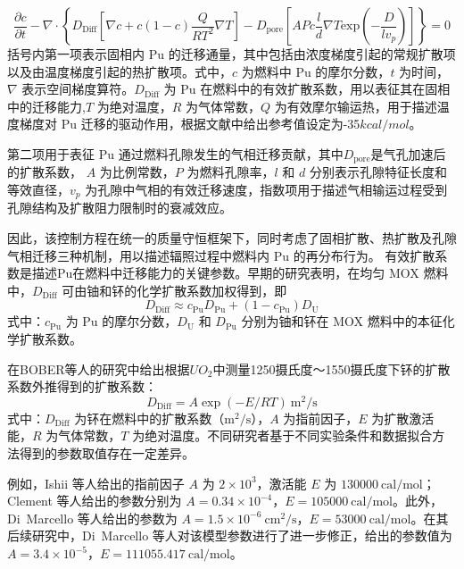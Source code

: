 \begin{equation}
	\frac{\partial c}{\partial t} - \nabla \cdot \left\{D_{\mathrm{Diff}}\left[ \nabla c + c(1-c)\frac{Q}{RT^{2}}\nabla T\right]    - D_{\mathrm{pore}}\left[ APc\frac{l}{d} \nabla T \text{exp}\left(-\frac{D}{lv_p}\right)\right] \right\} = 0
\end{equation}
括号内第一项表示固相内 Pu 的迁移通量，其中包括由浓度梯度引起的常规扩散项以及由温度梯度引起的热扩散项。式中，$c$ 为燃料中 Pu 的摩尔分数，$t$ 为时间，$\nabla$ 表示空间梯度算符。$D_{\mathrm{Diff}}$ 为 Pu 在燃料中的有效扩散系数，用以表征其在固相中的迁移能力,$T$ 为绝对温度，$R$ 为气体常数，$Q$ 为有效摩尔输运热，用于描述温度梯度对 Pu 迁移的驱动作用，根据文献\cite{ishiiInvestigationPuMigration2001,clementPlutoniumRedistributionMixed1978}中给出参考值设定为-35$kcal/mol$。

第二项用于表征 Pu 通过燃料孔隙发生的气相迁移贡献，其中$D_{\mathrm{pore}}$是气孔加速后的扩散系数， $A$ 为比例常数，$P$ 为燃料孔隙率，$l$ 和 $d$ 分别表示孔隙特征长度和等效直径，$v_p$ 为孔隙中气相的有效迁移速度，指数项用于描述气相输运过程受到孔隙结构及扩散阻力限制时的衰减效应。

因此，该控制方程在统一的质量守恒框架下，同时考虑了固相扩散、热扩散及孔隙气相迁移三种机制，用以描述辐照过程中燃料内 Pu 的再分布行为。
有效扩散系数是描述Pu在燃料中迁移能力的关键参数。早期的研究表明\cite{boberPlutoniumRedistributionFast1973}，在均匀 MOX 燃料中，$D_{\mathrm{Diff}}$ 可由铀和钚的化学扩散系数加权得到，即
\begin{equation}
	D_{\mathrm{Diff}} \approx c_{\mathrm{Pu}} D_{\mathrm{Pu}} + (1 - c_{\mathrm{Pu}}) D_{\mathrm{U}}
\end{equation}
式中：$c_{\mathrm{Pu}}$ 为 Pu 的摩尔分数，$D_{\mathrm{U}}$ 和 $D_{\mathrm{Pu}}$ 分别为铀和钚在 MOX 燃料中的本征化学扩散系数。

在BOBER等人\cite{clementPlutoniumRedistributionMixed1978,boberPlutoniumRedistributionFast1973}的研究中给出根据$UO_2$中测量1250摄氏度～1550摄氏度下钚的扩散系数外推得到的扩散系数：
\begin{equation}
	D_{\mathrm{Diff}} = A\exp(-E / RT) \ \mathrm{m}^2/\mathrm{s}
\end{equation}
式中：$D_{\mathrm{Diff}}$ 为钚在燃料中的扩散系数（$\mathrm{m^2/s}$），$A$ 为指前因子，$E$ 为扩散激活能，$R$ 为气体常数，$T$ 为绝对温度。不同研究者基于不同实验条件和数据拟合方法得到的参数取值存在一定差异。

例如，Ishii 等人\cite{ishiiInvestigationPuMigration2001}给出的指前因子 $A$ 为 $2\times10^{3}$，激活能 $E$ 为 $130000\ \mathrm{cal/mol}$；Clement 等人\cite{clementPlutoniumRedistributionMixed1978}给出的参数分别为 $A=0.34\times10^{-4}$，$E=105000\ \mathrm{cal/mol}$。此外，Di~Marcello 等人\cite{dimarcelloExtensionTRANSURANUSPlutonium2012}给出的参数为 $A=1.5\times10^{-6}\ \mathrm{cm^2/s}$，$E=53000\ \mathrm{cal/mol}$。在其后续研究\cite{dimarcelloModellingActinideRedistribution2014}中，Di~Marcello 等人对该模型参数进行了进一步修正，给出的参数值为 $A=3.4\times10^{-5}$，$E=111055.417\ \mathrm{cal/mol}$。

